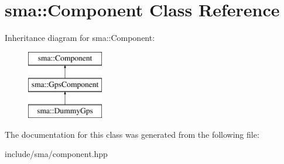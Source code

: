 \hypertarget{classsma_1_1Component}{\section{sma\-:\-:Component Class Reference}
\label{classsma_1_1Component}
}
Inheritance diagram for sma\-:\-:Component\-:\begin{figure}[H]
\begin{center}
\leavevmode
\includegraphics[height=3.000000cm]{classsma_1_1Component}
\end{center}
\end{figure}


The documentation for this class was generated from the following file\-:\begin{DoxyCompactItemize}
\item 
include/sma/component.\-hpp\end{DoxyCompactItemize}
